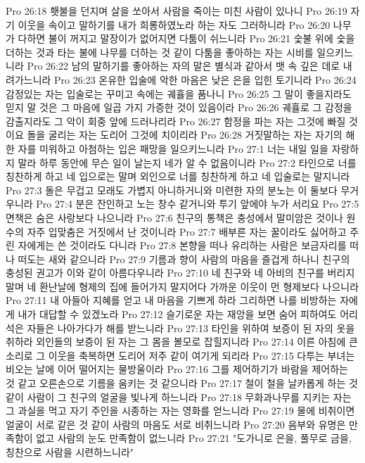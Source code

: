 Pro 26:18  횃불을 던지며 살을 쏘아서 사람을 죽이는 미친 사람이 있나니
Pro 26:19  자기 이웃을 속이고 말하기를 내가 희롱하였노라 하는 자도 그러하니라
Pro 26:20  나무가 다하면 불이 꺼지고 말장이가 없어지면 다툼이 쉬느니라
Pro 26:21  숯불 위에 숯을 더하는 것과 타는 불에 나무를 더하는 것 같이 다툼을 좋아하는 자는 시비를 일으키느니라
Pro 26:22  남의 말하기를 좋아하는 자의 말은 별식과 같아서 뱃 속 깊은 데로 내려가느니라
Pro 26:23  온유한 입술에 악한 마음은 낮은 은을 입힌 토기니라
Pro 26:24  감정있는 자는 입술로는 꾸미고 속에는 궤휼을 품나니
Pro 26:25  그 말이 좋을지라도 믿지 말 것은 그 마음에 일곱 가지 가증한 것이 있음이라
Pro 26:26  궤휼로 그 감정을 감출지라도 그 악이 회중 앞에 드러나리라
Pro 26:27  함정을 파는 자는 그것에 빠질 것이요 돌을 굴리는 자는 도리어 그것에 치이리라
Pro 26:28  거짓말하는 자는 자기의 해한 자를 미워하고 아첨하는 입은 패망을 일으키느니라
Pro 27:1  너는 내일 일을 자랑하지 말라 하루 동안에 무슨 일이 날는지 네가 알 수 없음이니라
Pro 27:2  타인으로 너를 칭찬하게 하고 네 입으로는 말며 외인으로 너를 칭찬하게 하고 네 입술로는 말지니라
Pro 27:3  돌은 무겁고 모래도 가볍지 아니하거니와 미련한 자의 분노는 이 둘보다 무거우니라
Pro 27:4  분은 잔인하고 노는 창수 같거니와 투기 앞에야 누가 서리요
Pro 27:5  면책은 숨은 사랑보다 나으니라
Pro 27:6  친구의 통책은 충성에서 말미암은 것이나 원수의 자주 입맞춤은 거짓에서 난 것이니라
Pro 27:7  배부른 자는 꿀이라도 싫어하고 주린 자에게는 쓴 것이라도 다니라
Pro 27:8  본향을 떠나 유리하는 사람은 보금자리를 떠나 떠도는 새와 같으니라
Pro 27:9  기름과 향이 사람의 마음을 즐겁게 하나니 친구의 충성된 권고가 이와 같이 아름다우니라
Pro 27:10  네 친구와 네 아비의 친구를 버리지 말며 네 환난날에 형제의 집에 들어가지 말지어다 가까운 이웃이 먼 형제보다 나으니라
Pro 27:11  내 아들아 지혜를 얻고 내 마음을 기쁘게 하라 그리하면 나를 비방하는 자에게 내가 대답할 수 있겠노라
Pro 27:12  슬기로운 자는 재앙을 보면 숨어 피하여도 어리석은 자들은 나아가다가 해를 받느니라
Pro 27:13  타인을 위하여 보증이 된 자의 옷을 취하라 외인들의 보증이 된 자는 그 몸을 볼모로 잡힐지니라
Pro 27:14  이른 아침에 큰 소리로 그 이웃을 축복하면 도리어 저주 같이 여기게 되리라
Pro 27:15  다투는 부녀는 비오는 날에 이어 떨어지는 물방울이라
Pro 27:16  그를 제어하기가 바람을 제어하는 것 같고 오른손으로 기름을 움키는 것 같으니라
Pro 27:17  철이 철을 날카롭게 하는 것 같이 사람이 그 친구의 얼굴을 빛나게 하느니라
Pro 27:18  무화과나무를 지키는 자는 그 과실을 먹고 자기 주인을 시종하는 자는 영화를 얻느니라
Pro 27:19  물에 비취이면 얼굴이 서로 같은 것 같이 사람의 마음도 서로 비취느니라
Pro 27:20  음부와 유명은 만족함이 없고 사람의 눈도 만족함이 없느니라
Pro 27:21  "도가니로 은을, 풀무로 금을, 칭찬으로 사람을 시련하느니라"
